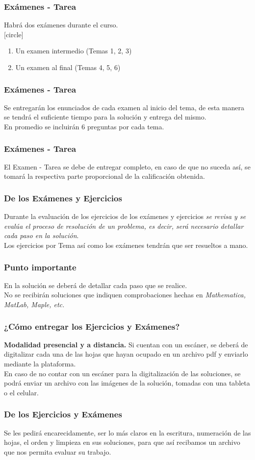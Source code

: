 \documentclass[12pt]{beamer}
\begin{document}
\begin{frame}
\frametitle{Exámenes - Tarea}
Habrá dos exámenes durante el curso.
\\
\bigskip
\pause
{}
[circle]
\begin{enumerate}[<+->]
\item Un examen intermedio (Temas 1, 2, 3)
\item Un examen al final (Temas 4, 5, 6)
\end{enumerate}
\end{frame}
\begin{frame}
\frametitle{Exámenes - Tarea}
Se entregarán los enunciados de cada examen al inicio del tema, de esta manera se tendrá el suficiente tiempo para la solución y entrega del mismo.
\\
\bigskip
\pause
En promedio se incluirán 6 preguntas por cada tema.
\end{frame}
\begin{frame}
\frametitle{Exámenes - Tarea}
El Examen - Tarea se debe de entregar completo, en caso de que no suceda así, se tomará la respectiva parte proporcional de la calificación obtenida.
\end{frame}
\begin{frame}
\frametitle{De los Exámenes y Ejercicios}
Durante la evaluación de los ejercicios de los exámenes y ejercicios  \emph{se revisa y se evalúa el proceso de resolución de un problema, es decir, será necesario detallar cada paso en la solución}.
\\
\bigskip
\pause
Los ejercicios por Tema así como los exámenes tendrán que ser resueltos a mano.
\end{frame}
\begin{frame}
\frametitle{Punto importante}
En la solución se deberá de detallar cada paso que se realice.
\\
\bigskip
\pause
No se recibirán soluciones que indiquen comprobaciones hechas en \emph{Mathematica, MatLab, Maple, etc.}
\end{frame}
\begin{frame}
\frametitle{¿Cómo entregar los Ejercicios y Exámenes?}
\textbf{Modalidad presencial y a distancia. } Si cuentan con un escáner, se deberá de digitalizar cada una de las hojas que hayan ocupado en un archivo pdf y enviarlo mediante la plataforma.
\\
\bigskip
\pause
En caso de no contar con un escáner para la digitalización de las soluciones, se podrá enviar un archivo con las imágenes de la solución, tomadas con una tableta o el celular.
\end{frame}
\begin{frame}
\frametitle{De los Ejercicios y Exámenes}
Se les pedirá encarecidamente, ser lo más claros en la escritura, numeración de las hojas, el orden y limpieza en sus soluciones, para que así recibamos un archivo que nos permita evaluar su trabajo.
\end{frame}
\end{document}
